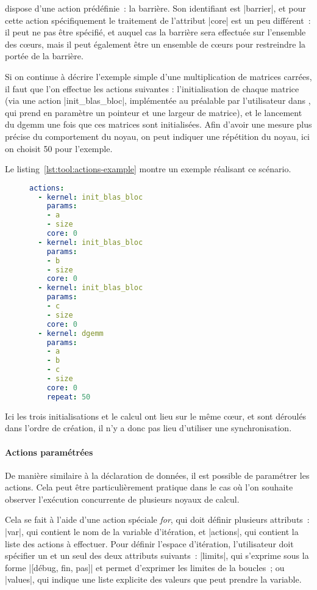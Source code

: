 \outil dispose d'une action prédéfinie~: la barrière. Son identifiant est |barrier|, et pour cette action spécifiquement le traitement de l'attribut |core| est un peu différent~: il peut ne pas être spécifié, et auquel cas la barrière sera effectuée sur l'ensemble des cœurs, mais il peut également être un ensemble de cœurs pour restreindre la portée de la barrière.


Si on continue à décrire l'exemple simple d'une multiplication de matrices carrées, il faut que l'on effectue les actions suivantes : l'initialisation de chaque matrice (via une action |init_blas_bloc|, implémentée au préalable par l'utilisateur dans \outil, qui prend en paramètre un pointeur et une largeur de matrice), et le lancement du dgemm une fois que ces matrices sont initialisées.
Afin d'avoir une mesure plus précise du comportement du noyau, on peut indiquer une répétition du noyau, ici on choisit 50 pour l'exemple.

Le listing~\ref{lst:tool:actions-example} montre un exemple réalisant ce scénario.

\begin{figure}[h!]
\begin{lstlisting}[language=yaml,caption=Exemple d'actions à réaliser pour une multiplication de matrice,label=lst:tool:actions-example]
actions:
  - kernel: init_blas_bloc
    params:
    - a
    - size
    core: 0
  - kernel: init_blas_bloc
    params:
    - b
    - size
    core: 0
  - kernel: init_blas_bloc
    params:
    - c
    - size
    core: 0
  - kernel: dgemm
    params:
    - a
    - b
    - c
    - size
    core: 0
    repeat: 50
\end{lstlisting}
\end{figure}

Ici les trois initialisations et le calcul ont lieu sur le même cœur, et sont déroulés dans l'ordre de création, il n'y a donc pas lieu d'utiliser une synchronisation.

\paragraph{Actions paramétrées}

De manière similaire à la déclaration de données, il est possible de paramétrer les actions.
Cela peut être particulièrement pratique dans le cas où l'on souhaite observer l'exécution concurrente de plusieurs noyaux de calcul.

Cela se fait à l'aide d'une action spéciale \emph{for}, qui doit définir plusieurs attributs~: |var|, qui contient le nom de la variable d'itération, et |actions|, qui contient la liste des actions à effectuer.
Pour définir l'espace d'itération, l'utilisateur doit spécifier un et un seul des deux attributs suivants~: |limits|, qui s'exprime sous la forme |[débug, fin, pas]| et permet d'exprimer les limites de la boucles~; ou |values|, qui indique une liste explicite des valeurs que peut prendre la variable.


